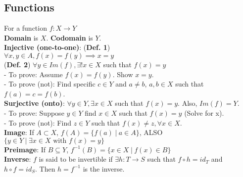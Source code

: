 \documentclass{article}
\newcommand\setbar{\hspace{3pt} \big| \hspace{3pt}}
\begin{document}
\begin{multicols}{3}
\subsection*{Functions}
  For a function $f: X \to Y$\\
  \textbf{Domain} is $X$. \textbf{Codomain} is $Y$.\\
  \textbf{Injective (one-to-one)}: (\textbf{Def. 1}) \\$\forall x,y \in A, f(x) = f(y) \implies x = y$\\ (\textbf{Def. 2}) $\forall y \in Im(f), \exists ! x \in X$ such that $f(x) = y$\\
  - To prove: Assume $f(x) = f(y)$. Show $x = y$.\\
  - To prove (not): Find specific $c \in Y$ and $a \not = b$, $a,b\in X$ such that $f(a) = c = f(b)$.\\
  \textbf{Surjective (onto)}: $\forall y \in Y, \exists x \in X$ such that $f(x) = y$. Also, $Im(f) = Y$.\\
  - To prove: Suppose $y \in Y$ find $x \in X$ such that $f(x) = y$ (Solve for x).\\ 
  - To prove (not): Find $z \in Y$ such that $f(x) \not = z, \forall x \in X$.\\
  \textbf{Image}: If $A \subset X$, $f(A) = \{f(a)\setbar a \in A\}$, 
  ALSO $\{y \in Y\setbar \exists x \in X \text{ with } f(x) = y\}$\\
  \textbf{Preimage}: If $B \subseteq Y$, $f^{-1}(B) = \{x \in X \setbar f(x) \in B \}$\\
  \textbf{Inverse}: $f$ is said to be invertible if $\exists h:T \to S$ such that
  $f \circ h = id_T$ and $h \circ f = id_S$. Then $h = f^{-1}$ is the inverse.

\end{multicols}
\end{document}
